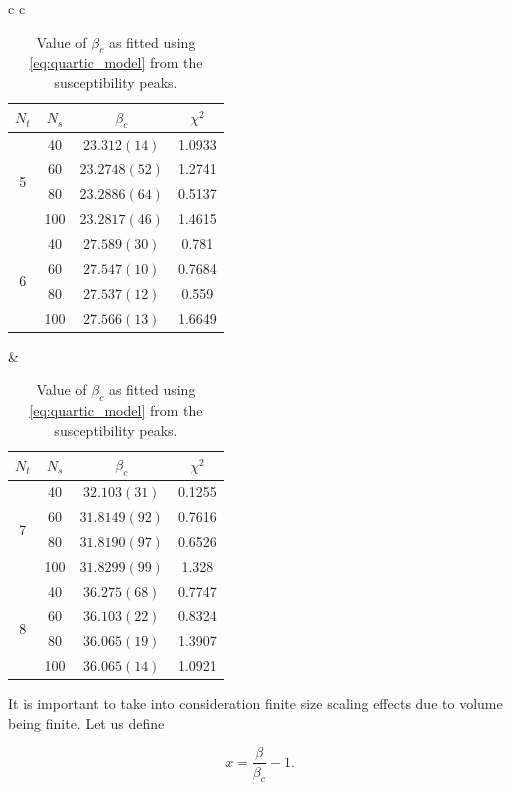\documentclass[reqno,12pt]{article}
\numberwithin{equation}{section}
\begin{document}
\begin{table}[h]
\begin{center}
	\begin{tabular}{c c}
		\begin{tabular}{|c|c|c|c|}
			\hline
			$N_t$ & $N_s$ & $\beta_c$ & $\chi^2$ \\
			\hline
			\multirow{4}{*}{5} 
			& 40  & $23.312(14)$   & 1.0933\\
			& 60  & $23.2748(52)$ & 1.2741 \\
			& 80  & $23.2886(64)$ & 0.5137 \\
			& 100 & $23.2817(46)$ & 1.4615 \\
			\hline
			\multirow{4}{*}{6} 
			& 40  & $27.589(30)$  & 0.781 \\
			& 60  & $27.547(10)$  & 0.7684 \\
			& 80  & $27.537(12)$ & 0.559 \\
			& 100 & $27.566(13)$ & 1.6649 \\
			\hline
		\end{tabular}
		&
		\begin{tabular}{|c|c|c|c|}
			\hline
			$N_t$ & $N_s$ & $\beta_c$ & $\chi^2$ \\
			\hline
			\multirow{4}{*}{7} 
			& 40  & $32.103(31) $  & 0.1255 \\
			& 60  & $31.8149(92)$ & 0.7616 \\
			& 80  & $31.8190(97)$  & 0.6526 \\
			& 100 & $31.8299(99)$ & 1.328 \\
			\hline
			\multirow{4}{*}{8} 
			& 40  & $36.275(68)$ & 0.7747 \\
			& 60  & $36.103(22)$ & 0.8324 \\
			& 80  & $36.065(19)$ & 1.3907 \\
			& 100 & $36.065(14)$ & 1.0921 \\
			\hline			
		\end{tabular}
	\end{tabular}
\end{center}
\caption[Fitted $\beta_c$]{Value of $\beta_c$ as fitted using \eqref{eq:quartic_model} from the susceptibility peaks.}
\label{table:beta_c}
\end{table}

It is important to take into consideration finite size scaling effects due to volume being finite.
Let us define

\begin{equation}
	x = \frac{\beta}{\beta_c} - 1.
\end{equation}
\end{document}
